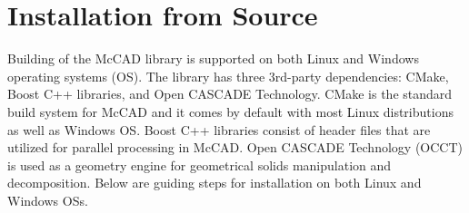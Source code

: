\documentclass[12pt, a4paper, titlepage]{article}
\begin{document}
\section{Installation from Source} \label{sec:Installation from Source}
Building of the McCAD library is supported on both Linux and Windows operating systems (OS). The library has three 3rd-party dependencies: CMake, Boost C++ libraries, and Open CASCADE Technology. CMake is the standard build system for McCAD and it comes by default with most Linux distributions as well as Windows OS. Boost C++ libraries consist of header files that are utilized for parallel processing in McCAD. Open CASCADE Technology (OCCT) is used as a geometry engine for geometrical solids manipulation and decomposition. Below are guiding steps for installation on both Linux and Windows OSs. 
\end{document}
